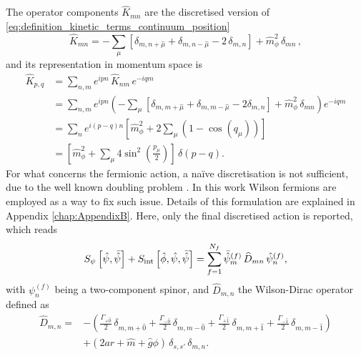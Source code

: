 The operator components $\widehat{K}_{mn}$ are the discretised version of \eqref{eq:definition_kinetic_terms_continuum_position}
\begin{equation}
    \widehat{K}_{mn} = - \sum_\mu \left[\delta_{m,n+\hat\mu} + \delta_{m,n-\hat\mu} - 2 \, \delta_{m,n}\right] + \hat{m}_\phi^2 \, \delta_{mn} \, ,
    \label{eq:discretised_kinetic_op_bosons}
\end{equation}
and its representation in momentum space is
\begin{equation*}
	\begin{aligned}
		\widehat{K}_{p, q} & =\sum_{n, m} e^{i p n} \, \widehat{K}_{n m} \, e^{-i q m} \\
		& =\sum_{n, m} e^{i p n}\left(-\sum_\mu\left[\delta_{m,m+\hat\mu}+\delta_{m,m-\hat\mu}-2 \delta_{m, n}\right] + \hat{m}_\phi^2 \, \delta_{mn}\right) e^{-i q m} \\
		& =\sum_{n} e^{i(p-q) n}\left[\hat{m}_\phi^2+2\sum_\mu \left(1-\cos \left(q_\mu\right)\right)\right] \\
		& = \left[\hat{m}_\phi^2 + \sum_\mu 4 \sin ^2\left(\frac{p_\mu}{2}\right) \right] \, \delta(p-q) .
	\end{aligned}
\end{equation*}
For what concerns the fermionic action, a na\"ive discretisation is not sufficient, due to the well known doubling problem \cite{rothe_LGT,Montvay1994QuantumLattice}. In this work Wilson fermions \cite{wilson_lqcd} are employed as a way to fix such issue. Details of this formulation are explained in Appendix \ref{chap:AppendixB}. Here, only the final discretised action is reported, which reads
\begin{equation}
		S_\psi\left[\hat{\psi}, \bar{\hat{\psi}} \right] + S_\text{int}\left[\hat{\phi}, \hat{\psi}, \bar{\hat{\psi}} \right] = \sum_{f=1}^{N_f}\bar{\hat{\psi}}_m^{(f)} \, \widehat{D}_{mn} \, \hat{\psi}_n^{(f)},
\end{equation}
with $\psi_n^{(f)}$ being a two-component spinor, and $\widehat{D}_{m,n}$ the Wilson-Dirac operator defined as 
\begin{equation}
    \begin{aligned}
    \widehat{D}_{m, n} = &- \left(\frac{\Gamma_{+\hat 0}}{2} \, \delta_{m, m+\hat 0} +\frac{\Gamma_{-\hat 0}}{2} \, \delta_{m, m-\hat 0} + \frac{\Gamma_{+\hat 1}}{2} \, \delta_{m, m+\hat 1} + \frac{\Gamma_{- \hat 1}}{2} \, \delta_{m, m-\hat 1}\right)  \\
     &+ \left(2ar + \hat m + \hat g \phi\right) \, \delta_{s,s'} \, \delta_{m,n}. \\
    \end{aligned}
    \label{eq:wilson-dirac_operator}
\end{equation}
